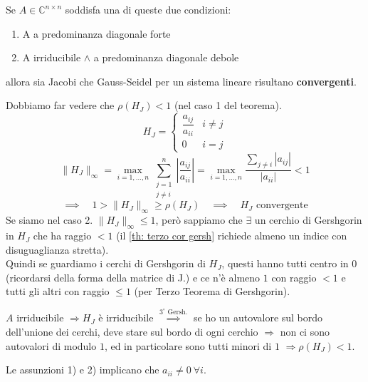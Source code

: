 \documentclass[12pt,a4paper,]{report}
\begin{document}
\begin{teorema}
    Se $A\in \mathbb{C}^{n\times n}$ soddisfa una di queste due condizioni:
    \begin{enumerate}
        \item A a predominanza diagonale forte
        \item A irriducibile $\land$ a predominanza diagonale debole
    \end{enumerate}
    allora sia Jacobi che Gauss-Seidel per un sistema lineare risultano \textbf{convergenti}.
\end{teorema}

\begin{lezione}
    [Lezione 11 08/04]  
\end{lezione}

\begin{dimostrazione}   
    Dobbiamo far vedere che $\rho(H_J)<1$ (nel caso 1 del teorema).
    \[
    H_J = 
    \begin{cases}
    \dfrac{a_{ij}}{a_{ii}} & i\neq j\\[6pt]
    0 & i=j
    \end{cases}
    \]
    \[
    \|H_J\|_\infty = \max_{i=1,\dots,n}\sum_{\substack{j=1\\ j\neq i}}^n \left|\frac{a_{ij}}{a_{ii}}\right| = \max_{i=1,\dots,n} \frac{\sum_{j\neq i}|a_{ij}|}{|a_{ii}|} < 1
    \]
    \[
    \implies \quad 1 > \|H_J\|_\infty \geq \rho(H_J) \quad \implies \quad H_J \text{ convergente}
    \]
    Se siamo nel caso 2. $\|H_J\|_\infty\leq1$, però sappiamo che $\exists$ un cerchio di Gershgorin in $H_J$ che ha raggio $<1$ (il \autoref{th: terzo cor gersh} richiede almeno un indice con disuguaglianza stretta).\\
    Quindi se guardiamo i cerchi di Gershgorin di $H_J$, questi hanno tutti centro in $0$ (ricordarsi della forma della matrice di J.) e ce n'è almeno $1$ con raggio $<1$ e tutti gli altri con raggio $\leq1$ (per Terzo Teorema di Gershgorin).

    \medskip
    \noindent
    $A$ irriducibile $\Rightarrow H_J$ è irriducibile $\overset{3^\circ\text{ Gersh.}}{\implies}$ se ho un autovalore sul bordo dell'unione dei cerchi, deve stare sul bordo di ogni cerchio $\Rightarrow$ non ci sono autovalori di modulo $1$, ed in particolare sono tutti minori di $1$ $\Rightarrow \rho(H_J)<1$.

    \begin{nota}
        [Osservazione]
        Le assunzioni 1) e 2) implicano che $a_{ii}\neq0\ \forall i$.
    \end{nota}


\end{dimostrazione}
\end{document}
